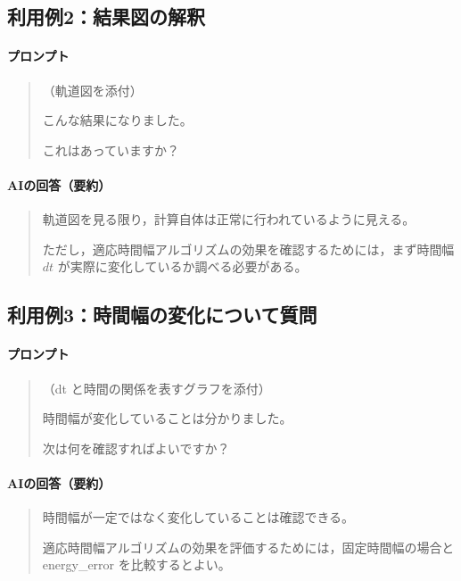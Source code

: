 \documentclass[uplatex,dvipdfmx]{jsarticle}
\begin{document}
\subsection*{利用例2：結果図の解釈}

\paragraph{プロンプト}

\begin{quote}
（軌道図を添付）

こんな結果になりました。

これはあっていますか？
\end{quote}

\paragraph{AIの回答（要約）}

\begin{quote}
軌道図を見る限り，計算自体は正常に行われているように見える。

ただし，適応時間幅アルゴリズムの効果を確認するためには，まず時間幅 $dt$ が実際に変化しているか調べる必要がある。
\end{quote}

\subsection*{利用例3：時間幅の変化について質問}

\paragraph{プロンプト}

\begin{quote}
（dt と時間の関係を表すグラフを添付）

時間幅が変化していることは分かりました。

次は何を確認すればよいですか？
\end{quote}

\paragraph{AIの回答（要約）}

\begin{quote}
時間幅が一定ではなく変化していることは確認できる。

適応時間幅アルゴリズムの効果を評価するためには，固定時間幅の場合と energy\_error を比較するとよい。
\end{quote}
\end{document}
